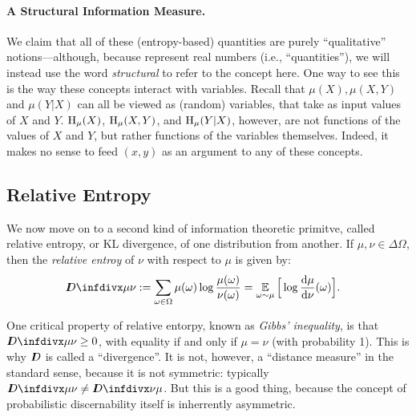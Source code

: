 \paragraph{A Structural Information Measure.} 
We claim that all of these (entropy-based) quantities are purely ``qualitative'' notions---although, because represent real numbers (i.e., ``quantities''), we will instead use the word \emph{structural} to refer to the concept here.
One way to see this is the way these concepts interact with variables. 
Recall that $\mu(X), \mu(X,Y)$ and $\mu(Y|X)$ can all be viewed as (random) variables, that take as input values of $X$ and $Y$. 
$\operatorname{\mathrm{H}}_\mu(X)$, $\operatorname{\mathrm{H}}_\mu(X,Y)$, and $\operatorname{\mathrm{H}}_\mu(Y|X)$, however, 
    are not functions of the values of $X$ and $Y$, but rather functions 
    of the variables themselves. 
Indeed, it makes no sense to feed $(x,y)$ as an argument to any of these concepts. 



\subsection{Relative Entropy}
    \label{sec:relent-primer}

We now move on to a second kind of information theoretic primitve, called relative entropy, or KL divergence, of one distribution from another. If $\mu, \nu \in \Delta \Omega$, then the \emph{relative entroy} of $\nu$ with respect to $\mu$ is given by:
%
\begin{align*}
    \kldiv {\mu} {\nu} 
    &:= \sum_{ \omega \in \Omega } \mu(\omega) \log \frac{ \mu(\omega) }{ \nu(\omega) }
    = \Ex_{\omega \sim \mu} \Big[ \log \frac{\mathrm d \mu}{\mathrm d \nu}(\omega) \Big].
\end{align*}

One critical property of relative entorpy, known as \emph{Gibbs' inequality}, is that
$\kldiv{\mu}{\nu} \ge 0$,
with equality if and only if $\mu = \nu$ (with probability 1). 
This is why $I\mkern-8muD$ is called a ``divergence''. 
It is not, however, a ``distance measure'' in the standard sense, because it is not symmetric: typically $\kldiv{\mu}{\nu} \ne \kldiv{\nu}{\mu}$. 
%
But this is a good thing, because the concept of probabilistic discernability itself is inherrently asymmetric. 

